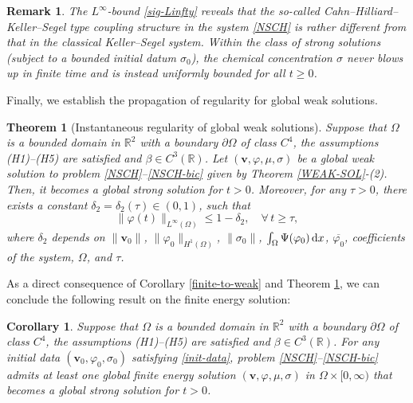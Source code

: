 \documentclass[11pt,reqno]{amsart}
\newtheorem{theorem}{\textbf{Theorem}}[section]
\newtheorem{corollary}{\textbf{Corollary}}[section]
\newtheorem{remark}{\textbf{Remark}}[section]
\def\d{{\rm d}}
\def\vv{\bm{v}}
\begin{document}
%
\begin{remark}\rm
The $L^\infty$-bound \eqref{sig-Linfty} reveals that the so-called Cahn--Hilliard--Keller--Segel type coupling structure in the system \eqref{NSCH} is rather different from that in the classical Keller--Segel system. Within the class of strong solutions (subject to a bounded initial datum $\sigma_0$), the chemical concentration $\sigma$ never blows up in finite time and is instead uniformly bounded for all $t\geq 0$.
\end{remark}

Finally, we establish the propagation of regularity for global weak solutions.
%
\begin{theorem}[Instantaneous regularity of global weak solutions]
	\label{regw}
Suppose that $\Omega$ is a bounded domain in $\mathbb{R}^2$ with a boundary $\partial \Omega$ of class $C^4$, the assumptions (H1)--(H5) are satisfied and $\beta\in C^3(\mathbb{R})$.
Let $(\vv,\varphi,\mu,\sigma)$ be a global weak solution to problem \eqref{NSCH}--\eqref{NSCH-bic} given by Theorem \ref{WEAK-SOL}-(2).
Then, it becomes a global strong solution for $t>0$. Moreover, for any $\tau>0$, there exists a constant $\delta_2= \delta_2(\tau)\in (0,1)$, such that
%
\begin{equation}
	\|\varphi(t)\|_{L^{\infty}(\Omega)} \leq 1- \delta_2,\quad \forall\, t \geq \tau,
\label{sep1w}
\end{equation}
%
where $\delta_2$ depends on $\|\vv_0\|$, $\|\varphi_0\|_{H^1(\Omega)}$, $\|\sigma_0\|$, $\int_\Omega \Psi(\varphi_0) \, \d x$, $\overline{\varphi_0}$, coefficients of the system, $\Omega$, and $\tau$.
\end{theorem}
%

As a direct consequence of Corollary \ref{finite-to-weak} and Theorem \ref{regw}, we can conclude the following result on the finite energy solution:
%
\begin{corollary}
Suppose that $\Omega$ is a bounded domain in $\mathbb{R}^2$ with a boundary $\partial \Omega$ of class $C^4$, the assumptions (H1)--(H5) are satisfied and $\beta\in C^3(\mathbb{R})$. For any initial data $(\bm{v}_0,\varphi_0,\sigma_0)$ satisfying
\eqref{init-data}, problem \eqref{NSCH}--\eqref{NSCH-bic} admits at least one global finite energy solution $(\vv,\varphi,\mu,\sigma)$ in $\Omega\times [0,\infty)$ that becomes a global strong solution for $t>0$.
\end{corollary}




\end{document}
